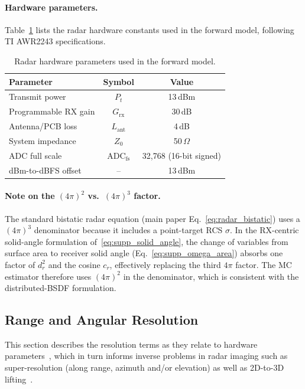 \paragraph{Hardware parameters.}
Table~\ref{tab:hardware_params} lists the radar hardware constants used in the forward model, following TI AWR2243 specifications.

\begin{table}[t]
\centering
\caption{Radar hardware parameters used in the forward model.}
\label{tab:hardware_params}
\begin{tabular}{lcc}
\toprule
\textbf{Parameter} & \textbf{Symbol} & \textbf{Value} \\
\midrule
Transmit power & $P_t$ & 13\,dBm \\
Programmable RX gain & $G_\text{rx}$ & 30\,dB \\
Antenna/PCB loss & $L_\text{ant}$ & 4\,dB \\
System impedance & $Z_0$ & 50\,$\Omega$ \\
ADC full scale & $\text{ADC}_\text{fs}$ & 32,768 (16-bit signed) \\
dBm-to-dBFS offset & -- & 13\,dBm \\
\bottomrule
\end{tabular}
\end{table}

\paragraph{Note on the $(4\pi)^2$ vs.\ $(4\pi)^3$ factor.}
The standard bistatic radar equation (main paper Eq.~\ref{eq:radar_bistatic}) uses a $(4\pi)^3$ denominator because it includes a point-target RCS $\sigma$. In the RX-centric solid-angle formulation of~\eqref{eq:supp_solid_angle}, the change of variables from surface area to receiver solid angle (Eq.~\ref{eq:supp_omega_area}) absorbs one factor of $d_r^2$ and the cosine $c_r$, effectively replacing the third $4\pi$ factor. The MC estimator therefore uses $(4\pi)^2$ in the denominator, which is consistent with the distributed-BSDF formulation.

\subsection{Range and Angular Resolution}
\label{sec:supp_range_angle_resolution}

This section describes the resolution terms as they relate to hardware parameters~\cite{9658500}, which in turn informs inverse problems in radar imaging such as super-resolution (along range, azimuth and/or elevation) as well as 2D-to-3D lifting~\cite{li2023azimuth}.

